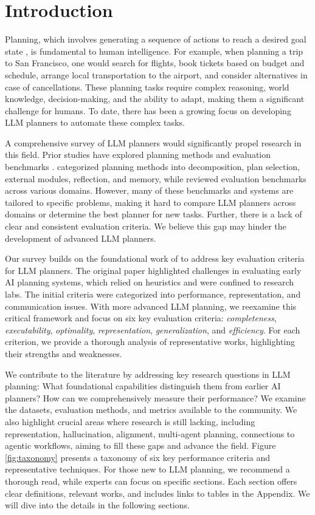 \section{Introduction}

Planning, which involves generating a sequence of actions to reach a desired goal state \cite{newell1958elements, kartam1990towards}, is fundamental to human intelligence. For example, when planning a trip to San Francisco, one would search for flights, book tickets based on budget and schedule, arrange local transportation to the airport, and consider alternatives in case of cancellations. These planning tasks require complex reasoning, world knowledge, decision-making, and the ability to adapt, making them a significant challenge for humans. To date, there has been a growing focus on developing LLM planners to automate these complex tasks.


A comprehensive survey of LLM planners would significantly propel research in this field. Prior studies have explored planning methods and evaluation benchmarks \cite{huang2024understanding, li2024lasp}. \citet{huang2024understanding} categorized planning methods into decomposition, plan selection, external modules, reflection, and memory, while \citet{li2024lasp} reviewed evaluation benchmarks across various domains. However, many of these benchmarks and systems are tailored to specific problems, making it hard to compare LLM planners across domains or determine the best planner for new tasks. Further, there is a lack of clear and consistent evaluation criteria. We believe this gap may hinder the development of advanced LLM planners.

Our survey builds on the foundational work of \citet{kartam1990towards} to address key evaluation criteria for LLM planners. 
The original paper highlighted challenges in evaluating early AI planning systems, which relied on heuristics and were confined to research labs. The initial criteria were categorized into performance, representation, and communication issues.
With more advanced LLM planning, we reexamine this critical framework and focus on six key evaluation criteria: \emph{completeness}, \emph{executability}, \emph{optimality}, \emph{representation}, \emph{generalization}, and \emph{efficiency}. For each criterion, we provide a thorough analysis of representative works, highlighting their strengths and weaknesses.

We contribute to the literature by addressing key research questions in LLM planning: What foundational capabilities distinguish them from earlier AI planners? How can we comprehensively measure their performance? We examine the datasets, evaluation methods, and metrics available to the community. We also highlight crucial areas where research is still lacking, including representation, hallucination, alignment, multi-agent planning, connections to agentic workflows, aiming to fill these gaps and advance the field. Figure \ref{fig:taxonomy} presents a taxonomy of six key performance criteria and representative techniques. For those new to LLM planning, we recommend a thorough read, while experts can focus on specific sections. Each section offers clear definitions, relevant works, and includes links to tables in the Appendix. We will dive into the details in the following sections.